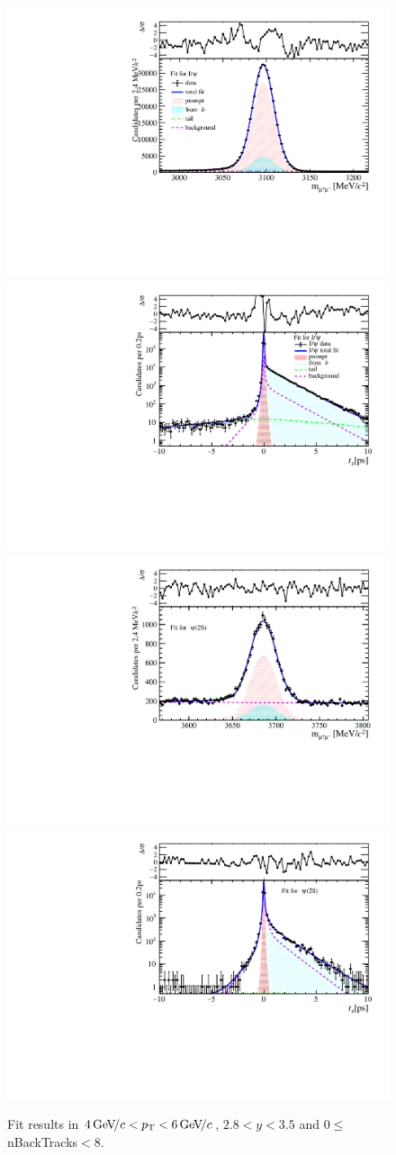 \begin{figure}[H]
\begin{center}
\includegraphics[width=0.47\linewidth]{pdf/Jpsi/drawmassB/n1y2pt3.pdf}
\includegraphics[width=0.47\linewidth]{pdf/Jpsi/2DFitB/n1y2pt3.pdf}
\vspace*{-0.5cm}
\includegraphics[width=0.47\linewidth]{pdf/Psi2S/drawmassB/n1y2pt3.pdf}
\includegraphics[width=0.47\linewidth]{pdf/Psi2S/2DFitB/n1y2pt3.pdf}
\vspace*{-0.5cm}
\end{center}
\caption{Fit results in $4\text{\,Ge\kern -0.1em V\!/}c<p_{\mathrm{T}}<6\text{\,Ge\kern -0.1em V\!/}c$, $2.8<y<3.5$ and 0$\leq$nBackTracks$<$8.}
\label{Fitn1y2pt3}
\end{figure}
